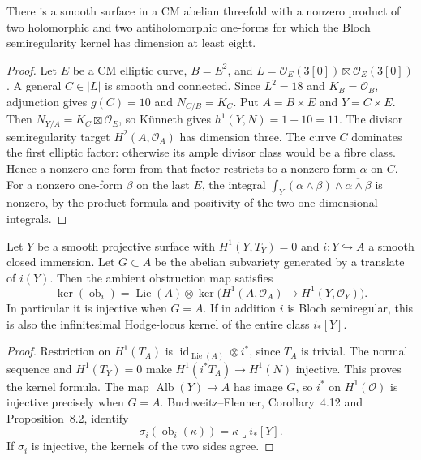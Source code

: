\begin{proposition}
\label{prop:semireg-period-counterexample}
There is a smooth surface in a CM abelian threefold with a nonzero
product of two holomorphic and two antiholomorphic one-forms for
which the Bloch semiregularity kernel has dimension at least eight.
\end{proposition}
\begin{proof}
Let $E$ be a CM elliptic curve, $B=E^2$, and
$L=\mathcal O_E(3[0])\boxtimes\mathcal O_E(3[0])$.
A general $C\in|L|$ is smooth and connected. Since $L^2=18$ and
$K_B=\mathcal O_B$, adjunction gives $g(C)=10$ and
$N_{C/B}=K_C$. Put $A=B\times E$ and $Y=C\times E$.
Then $N_{Y/A}=K_C\boxtimes\mathcal O_E$, so K\"unneth gives
$h^1(Y,N)=1+10=11$. The divisor semiregularity target
$H^2(A,\mathcal O_A)$ has dimension three.
The curve $C$ dominates the first elliptic factor: otherwise its
ample divisor class would be a fibre class. Hence a nonzero one-form
from that factor restricts to a nonzero form $\alpha$ on $C$.
For a nonzero one-form $\beta$ on the last $E$, the integral
$\int_Y(\alpha\wedge\beta)\wedge\overline{\alpha\wedge\beta}$
is nonzero, by the product formula and positivity of the two
one-dimensional integrals.
\end{proof}

\begin{proposition}
\label{prop:semireg-rigid-source}
Let $Y$ be a smooth projective surface with $H^1(Y,T_Y)=0$ and
$i:Y\hookrightarrow A$ a smooth closed immersion. Let $G\subset A$
be the abelian subvariety generated by a translate of $i(Y)$.
Then the ambient obstruction map satisfies
\[
\ker(\operatorname{ob}_i)=
\operatorname{Lie}(A)\otimes
\ker\bigl(H^1(A,\mathcal O_A)\to H^1(Y,\mathcal O_Y)\bigr).
\]
In particular it is injective when $G=A$. If in addition $i$ is
Bloch semiregular, this is also the infinitesimal Hodge-locus kernel
of the entire class $i_*[Y]$.
\end{proposition}
\begin{proof}
Restriction on $H^1(T_A)$ is $\operatorname{id}_{\operatorname{Lie}(A)}
\otimes i^*$, since $T_A$ is trivial. The normal sequence and
$H^1(T_Y)=0$ make $H^1(i^*T_A)\to H^1(N)$ injective.
This proves the kernel formula. The map $\operatorname{Alb}(Y)\to A$
has image $G$, so $i^*$ on $H^1(\mathcal O)$ is injective precisely
when $G=A$. Buchweitz--Flenner, Corollary~4.12 and Proposition~8.2,
identify
\[
 \sigma_i(\operatorname{ob}_i(\kappa))
 =\kappa\mathbin{\lrcorner}i_*[Y].
\]
If $\sigma_i$ is injective, the kernels of the two sides agree.
\end{proof}

